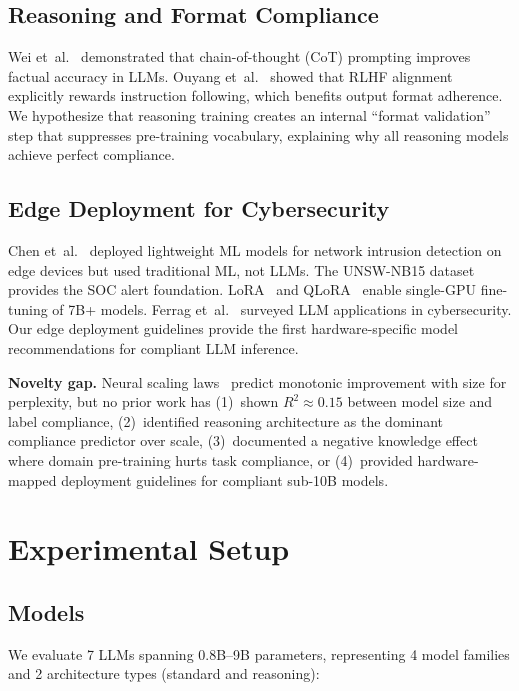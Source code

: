 \documentclass[review,3p]{elsarticle}
\begin{document}
\subsection{Reasoning and Format Compliance}
Wei et~al.~\cite{wei2022} demonstrated that chain-of-thought (CoT) prompting improves factual accuracy in LLMs. Ouyang et~al.~\cite{ouyang2022} showed that RLHF alignment explicitly rewards instruction following, which benefits output format adherence. We hypothesize that reasoning training creates an internal ``format validation'' step that suppresses pre-training vocabulary, explaining why all reasoning models achieve perfect compliance.

\subsection{Edge Deployment for Cybersecurity}
Chen et~al.~\cite{chen2023edge} deployed lightweight ML models for network intrusion detection on edge devices but used traditional ML, not LLMs. The UNSW-NB15 dataset~\cite{moustafa2016} provides the SOC alert foundation. LoRA~\cite{hu2022} and QLoRA~\cite{dettmers2023} enable single-GPU fine-tuning of 7B+ models. Ferrag et~al.~\cite{ferrag2024} surveyed LLM applications in cybersecurity. Our edge deployment guidelines provide the first hardware-specific model recommendations for compliant LLM inference.

\textbf{Novelty gap.} Neural scaling laws~\cite{kaplan2020} predict monotonic improvement with size for perplexity, but no prior work has (1)~shown $R^2 \approx 0.15$ between model size and label compliance, (2)~identified reasoning architecture as the dominant compliance predictor over scale, (3)~documented a negative knowledge effect where domain pre-training hurts task compliance, or (4)~provided hardware-mapped deployment guidelines for compliant sub-10B models.

\section{Experimental Setup}

\subsection{Models}
We evaluate 7 LLMs spanning 0.8B--9B parameters, representing 4 model families and 2 architecture types (standard and reasoning):
\end{document}
